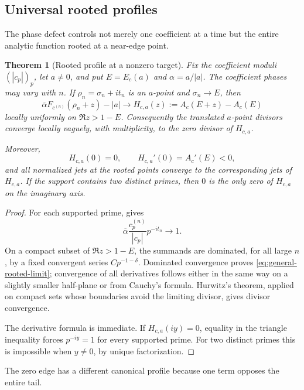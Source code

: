 \documentclass[11pt]{article}
\newtheorem{theorem}{Theorem}[section]
\theoremstyle{definition}
\theoremstyle{remark}
\begin{document}
\subsection{Universal rooted profiles}

The phase defect controls not merely one coefficient at a time but the
entire analytic function rooted at a near-edge point.

\begin{theorem}[Rooted profile at a nonzero target]
\label{thm:general-rooted-profile}
Fix the coefficient moduli $(|c_p|)_p$, let $a\ne0$, and put
$E=E_c(a)$ and $\alpha=a/|a|$.  The coefficient phases may vary with
$n$.  If $\rho_n=\sigma_n+it_n$ is an $a$-point and
$\sigma_n\to E$, then
\begin{equation}
 \overline\alpha F_{c^{(n)}}(\rho_n+z)-|a|
 \longrightarrow
 H_{c,a}(z):=A_c(E+z)-A_c(E)
 \label{eq:general-rooted-limit}
\end{equation}
locally uniformly on $\Re z>1-E$.  Consequently the translated
$a$-point divisors converge locally vaguely, with multiplicity, to the
zero divisor of $H_{c,a}$.

Moreover,
\[
 H_{c,a}(0)=0,
 \qquad
 H_{c,a}'(0)=A_c'(E)<0,
\]
and all normalized jets at the rooted points converge to the
corresponding jets of $H_{c,a}$.  If the support contains two distinct
primes, then $0$ is the only zero of $H_{c,a}$ on the imaginary axis.
\end{theorem}

\begin{proof}
For each supported prime,  gives
\[
 \overline\alpha\frac{c_p^{(n)}}{|c_p|}p^{-it_n}\longrightarrow1.
\]
On a compact subset of $\Re z>1-E$, the summands are dominated, for all
large $n$, by a fixed convergent series $C p^{-1-\delta}$.  Dominated
convergence proves \eqref{eq:general-rooted-limit}; convergence of all
derivatives follows either in the same way on a slightly smaller
half-plane or from Cauchy's formula.  Hurwitz's theorem, applied on
compact sets whose boundaries avoid the limiting divisor, gives divisor
convergence.

The derivative formula is immediate.  If $H_{c,a}(iy)=0$, equality in
the triangle inequality forces $p^{-iy}=1$ for every supported prime.
For two distinct primes this is impossible when $y\ne0$, by unique
factorization.
\end{proof}

The zero edge has a different canonical profile because one term opposes
the entire tail.
\end{document}
